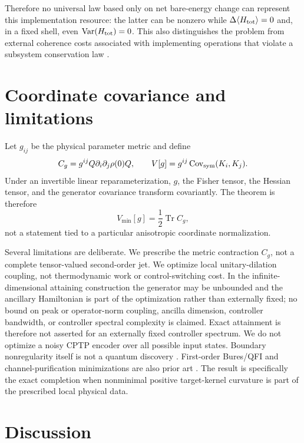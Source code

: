 \documentclass[aps,pra,preprint,nofootinbib]{revtex4-2}
\newcommand{\Tr}{\operatorname{Tr}}
\newcommand{\Var}{\operatorname{Var}}
\newcommand{\Htot}{H_{\rm tot}}
\begin{document}
Therefore no universal law based only on net bare-energy change can represent this implementation resource: the latter can be nonzero while $\Delta\langle\Htot\rangle=0$ and, in a fixed shell, even $\Var(\Htot)=0$. This also distinguishes the problem from external coherence costs associated with implementing operations that violate a subsystem conservation law \cite{TajimaShiraishiSaito2020}.

\section{Coordinate covariance and limitations}

Let $g_{ij}$ be the physical parameter metric and define
\begin{equation}
 C_g=g^{ij}Q\partial_i\partial_j\rho(0)Q,
 \qquad
 V[g]=g^{ij}\operatorname{Cov}_{\rm sym}(K_i,K_j).
\end{equation}
Under an invertible linear reparameterization, $g$, the Fisher tensor, the Hessian tensor, and the generator covariance transform covariantly. The theorem is therefore
\begin{equation}
 \boxed{V_{\min}[g]=\frac12\Tr C_g,}
\end{equation}
not a statement tied to a particular anisotropic coordinate normalization.

Several limitations are deliberate. We prescribe the metric contraction $C_g$, not a complete tensor-valued second-order jet. We optimize local unitary-dilation coupling, not thermodynamic work or control-switching cost. In the infinite-dimensional attaining construction the generator may be unbounded and the ancillary Hamiltonian is part of the optimization rather than externally fixed; no bound on peak or operator-norm coupling, ancilla dimension, controller bandwidth, or controller spectral complexity is claimed. Exact attainment is therefore not asserted for an externally fixed controller spectrum. We do not optimize a noisy CPTP encoder over all possible input states. Boundary nonregularity itself is not a quantum discovery \cite{Chernoff1954,Shapiro1985,SelfLiang1987}. First-order Bures/QFI and channel-purification minimizations are also prior art \cite{BraunsteinCaves1994,FujiwaraImai2008,EscherEtAl2011,DemkowiczKolodynskiGuta2012,CarrascoSpehner2026}. The result is specifically the exact completion when nonminimal positive target-kernel curvature is part of the prescribed local physical data.

\section{Discussion}
\end{document}
